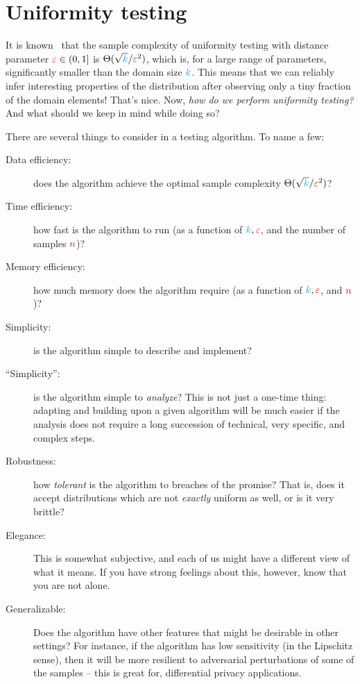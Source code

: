 \section{Uniformity testing}
  \label{sec:uniformity}

It is known~\citep{Paninski08} that the sample complexity of uniformity testing with distance parameter $\textcolor{red}{\varepsilon}\in(0,1]$ is $\Theta(\sqrt{{\textcolor{cyan}{k}}}/\textcolor{red}{\varepsilon}^2)$, which is, for a large range of parameters, significantly smaller than the domain size ${\textcolor{cyan}{k}}$. This means that we can reliably infer interesting properties of the distribution after observing only a tiny fraction of the domain elements! That's nice. Now, \emph{how do we perform uniformity testing?}  And what should we keep in mind while doing so?

There are several things to consider in a testing algorithm. To name a few:
\begin{description}
  \item[Data efficiency:] does the algorithm achieve the optimal sample complexity $\Theta(\sqrt{{\textcolor{cyan}{k}}}/\textcolor{red}{\varepsilon}^2)$?
  \item[Time efficiency:] how fast is the algorithm to run (as a function of ${\textcolor{cyan}{k}},\textcolor{red}{\varepsilon}$, and the number of samples ${\textcolor{purple}{n}}$)?
  \item[Memory efficiency:] how much memory does the algorithm require (as a function of ${\textcolor{cyan}{k}},\textcolor{red}{\varepsilon}$, and ${\textcolor{purple}{n}}$)?
  \item[Simplicity:] is the algorithm simple to describe and implement?
  \item[``Simplicity'':] is the algorithm simple to \emph{analyze}? This is not just a one-time thing: adapting and building upon a given algorithm will be much easier if the analysis does not require a long succession of technical, very specific, and complex steps.
  \item[Robustness:] how \emph{tolerant} is the algorithm to breaches of the promise? That is, does it accept distributions which are not \emph{exactly} uniform as well, or is it very brittle?
  \item[Elegance:] This is somewhat subjective, and each of us might have a different view of what it means. If you have strong feelings about this, however, know that you are not alone.
  \item[Generalizable:] Does the algorithm have other features that might be desirable in other settings? For instance, if the algorithm has low sensitivity (in the Lipschitz sense), then it will be more resilient to adversarial perturbations of some of the samples -- this is great for, \eg differential privacy applications. 
\end{description}

